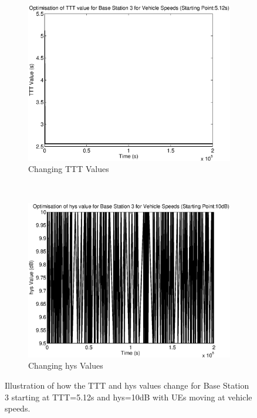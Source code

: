 \begin{figure}[H]
        \centering
        \begin{subfigure}[b]{0.49\textwidth}
                \includegraphics[width=\textwidth]{figures/graphs/vehhigh/TTT3.eps}
                \caption{Changing TTT Values}
        \end{subfigure}%
        ~ %
        \begin{subfigure}[b]{0.49\textwidth}
                \includegraphics[width=\textwidth]{figures/graphs/vehhigh/hys3.eps}
                \caption{Changing hys Values}
        \end{subfigure}
        \caption{Illustration of how the TTT and hys values change for Base Station 3 starting at TTT=5.12s and hys=10dB with UEs moving at vehicle speeds.}
\end{figure}
